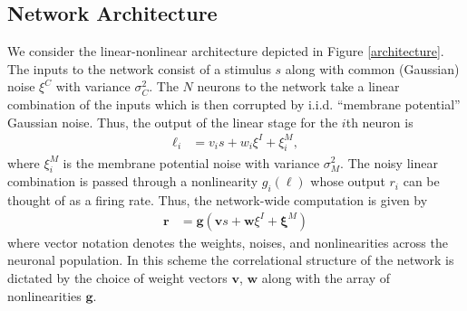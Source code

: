 \documentclass[11pt]{article}
\begin{document}
	\subsection{Network Architecture}
	We consider the linear-nonlinear architecture depicted in Figure \ref{architecture}. The inputs to the network consist of a stimulus $s$ along with common (Gaussian) noise $\xi^C$ with variance $\sigma_C^2$. The $N$ neurons to the network take a linear combination of the inputs which is then corrupted by i.i.d. ``membrane potential'' Gaussian noise. Thus, the output of the linear stage for the $i$th neuron is 
	\begin{align}
		\ell_i &= v_i s + w_i \xi^I + \xi^M_i,
	\end{align}
	where $\xi^M_i$ is the membrane potential noise with variance $\sigma_M^2$. The noisy linear combination is passed through a nonlinearity $g_i(\ell)$ whose output $r_i$ can be thought of as a firing rate. Thus, the network-wide computation is given by
	\begin{align}
		\mathbf{r} &= \mathbf{g}(\mathbf{v} s + \mathbf{w} \xi^I + \boldsymbol{\xi}^M)
	\end{align}
	where vector notation denotes the weights, noises, and nonlinearities across the neuronal population. In this scheme the correlational structure of the network is dictated by the choice of weight vectors $\mathbf{v}$, $\mathbf{w}$ along with the array of nonlinearities $\mathbf{g}$. 
\end{document}
